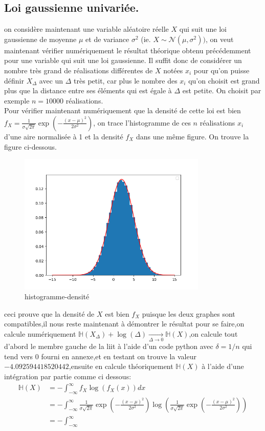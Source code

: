 \documentclass[a4paper]{article}
\begin{document}
\subsection{Loi gaussienne univariée.}
on considère maintenant une variable aléatoire réelle $X$ qui suit une loi gaussienne de moyenne $\mu$ et de variance $\sigma^{2}$ (ie. $X \sim \mathcal{N}(\mu, \sigma^{2}))$, on veut maintenant vérifier numériquement le résultat théorique obtenu précédemment pour une variable qui suit une loi gaussienne. Il suffit donc de considérer un nombre très grand de réalisations différentes de $X$ notées $x_i$ pour qu'on puisse définir $X_{\Delta}$ avec un $\Delta$ très petit, car plus le nombre des $x_i$ qu'on choisit est grand plus que la distance entre ses éléments qui est égale à $\Delta$ est petite. On choisit par exemple $n=10000$ réalisations.\\
Pour vérifier maintenant numériquement que la densité de cette loi est bien $f_{X}=\frac{1}{\sigma\sqrt{2\pi}}\exp\left(-\frac{(x-\mu)^{2}}{2\sigma^2}\right)$, on trace l'histogramme de ces $n$ réalisations $x_{i}$ d'une aire normalisée à 1 et la densité $f_{X}$ dans une même figure. On trouve la figure ci-dessous.

\begin{figure}[h]
  \centering
  \includegraphics[width=0.8\textwidth]{Figure_1.png}
  \caption{histogramme-densité}
\end{figure}
ceci prouve que la densité de $X$ est bien $f_X$ puisque les deux graphes sont compatibles,il nous reste maintenant à démontrer le résultat
pour se faire,on calcule numériquement $\mathbb{H}(X_\Delta)+\log(\Delta)\underset{\Delta \rightarrow 0}{\rightarrow}\mathbb{H}(X)$,on calcule tout d'abord le membre gauche de la liit à l'aide d'un code python avec $\delta=1/n$ qui tend vers 0 fourni en annexe,et en testant on trouve la valeur $-4.092594418520442$,ensuite en calcule théoriquement $\mathbb{H}(X)$ à l'aide d'une intégration par partie comme ci dessous:
\begin{align}
  \mathbb{H}(X) &= -\int_{-\infty}^{\infty}f_{X}\log(f_X(x))dx\\
  &=-\int_{-\infty}^{\infty}\frac{1}{\sigma\sqrt{2\pi}}\exp\left(-\frac{(x-\mu)^{2}}{2\sigma^2}\right)\log\left(\frac{1}{\sigma\sqrt{2\pi}}\exp\left(-\frac{(x-\mu)^{2}}{2\sigma^2}\right)\right)\\
  &=-\int_{-\infty}^{\infty}
\end{align}
\newpage
\end{document}
